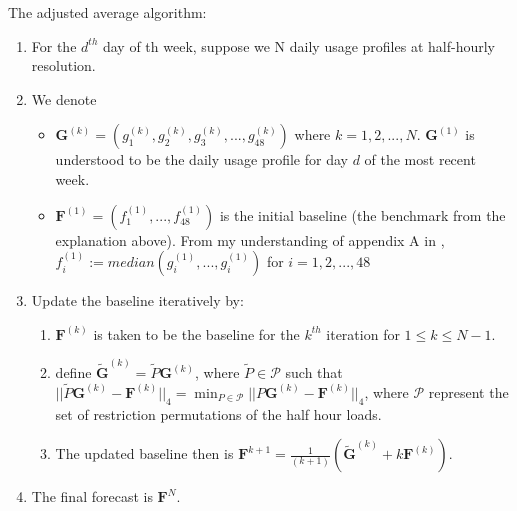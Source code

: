 \documentclass[a4paper]{article}
\begin{document}
The adjusted average algorithm:
\begin{enumerate}
\item For the $d^{th}$ day of th week, suppose we N daily usage profiles at half-hourly resolution.
\item We denote \begin{itemize}
\item $\textbf{G}^{(k)} = (g^{(k)}_1,g^{(k)}_2,g^{(k)}_3,...,g^{(k)}_{48})$ where $k=1,2,...,N$. $\textbf{G}^{(1)}$ is understood to be the daily usage profile for day $d$ of the most recent week.
\item $\textbf{F}^{(1)} = (f^{(1)}_1,...,f^{(1)}_{48})$ is the initial baseline (the benchmark from the explanation above). From my understanding of appendix A in \cite{Dan14}, $f^{(1)}_i := median(g^{(1)}_i,...,g^{(1)}_i)$ for $i = 1,2,...,48$
\end{itemize}
\item Update the baseline iteratively by: \begin{enumerate}
\item $\textbf{F}^{(k)}$ is taken to be the baseline for the $k^{th}$ iteration for $1\le k \le N-1$. 
\item define $\tilde{\textbf{G}}^{(k)} = \tilde{P}\textbf{G}^{(k)}$, where $\tilde{P} \in \mathscr{P}$ such that  $||\tilde{P}\textbf{G}^{(k)} - \textbf{F}^{(k)}||_4 = \displaystyle{\min_{P \in \mathscr{P}}}||P\textbf{G}^{(k)} - \textbf{F}^{(k)}||_4$, where $\mathscr{P}$ represent the set of restriction permutations of the half hour loads.
\item The updated baseline then is $\textbf{F}^{k+1} = \frac{1}{(k+1)}(\tilde{\textbf{G}}^{(k)} + k\textbf{F}^{(k)})$.
\end{enumerate}
\item The final forecast is $\textbf{F}^{N}$.
\end{enumerate}
\end{document}
